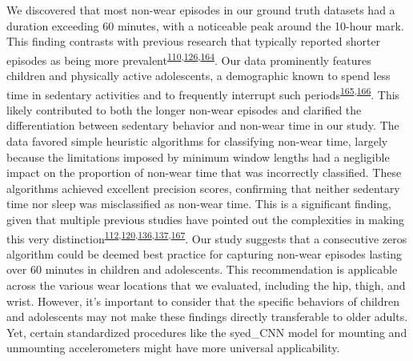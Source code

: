 \documentclass[
  10pt,
]{scrbook}
\begin{document}
We discovered that most non-wear episodes in our ground truth datasets
had a duration exceeding 60 minutes, with a noticeable peak around the
10-hour mark. This finding contrasts with previous research that
typically reported shorter episodes as being more
prevalent\textsuperscript{\protect\hyperlink{ref-aadland_comparison_2018}{110},\protect\hyperlink{ref-jaeschke_variability_2018}{126},\protect\hyperlink{ref-hutto_identifying_2013}{164}}.
Our data prominently features children and physically active
adolescents, a demographic known to spend less time in sedentary
activities and to frequently interrupt such
periods\textsuperscript{\protect\hyperlink{ref-cooper_objectively_2015}{165},\protect\hyperlink{ref-kwon_breaks_2012}{166}}.
This likely contributed to both the longer non-wear episodes and
clarified the differentiation between sedentary behavior and non-wear
time in our study. The data favored simple heuristic algorithms for
classifying non-wear time, largely because the limitations imposed by
minimum window lengths had a negligible impact on the proportion of
non-wear time that was incorrectly classified. These algorithms achieved
excellent precision scores, confirming that neither sedentary time nor
sleep was misclassified as non-wear time. This is a significant finding,
given that multiple previous studies have pointed out the complexities
in making this very
distinction\textsuperscript{\protect\hyperlink{ref-duncan_wear-time_2018}{112},\protect\hyperlink{ref-doherty_large_2017}{120},\protect\hyperlink{ref-troiano_physical_2008}{136},\protect\hyperlink{ref-choi_validation_2011}{137},\protect\hyperlink{ref-barouni_ambulatory_2020}{167}}.
Our study suggests that a consecutive zeros algorithm could be deemed
best practice for capturing non-wear episodes lasting over 60 minutes in
children and adolescents. This recommendation is applicable across the
various wear locations that we evaluated, including the hip, thigh, and
wrist. However, it's important to consider that the specific behaviors
of children and adolescents may not make these findings directly
transferable to older adults. Yet, certain standardized procedures like
the syed\_CNN model for mounting and unmounting accelerometers might
have more universal applicability.
\end{document}

